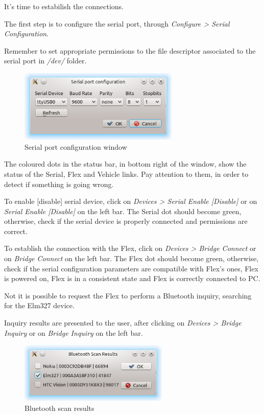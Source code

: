 \documentclass[twoside]{article}
\begin{document}
\begin{multicols}{2}
It's time to estabilish the connections.

The first step is to configure the serial port, through \emph{Configure > Serial Configuration}.

Remember to set appropriate permissions to the file descriptor associated to the serial port in \emph{/dev/} folder.

\begin{figure}[H]
  \centering
  \includegraphics[width=3in]{img/GUI/serial_port_configuration}
  \caption{Serial port configuration window}
\end{figure}


The coloured dots in the status bar, in bottom right of the window, show the status of the Serial, Flex and Vehicle links.
Pay attention to them, in order to detect if something is going wrong.

To enable [disable] serial device, click on \emph{Devices > Serial Enable [Disable]} or on \emph{Serial Enable [Disable]} on the left bar.
The Serial dot should become green, otherwise, check if the serial device is properly connected and permissions are correct.

To establish the connection with the Flex, click on \emph{Devices > Bridge Connect} or on \emph{Bridge Connect} on the left bar.
The Flex dot should become green, otherwise, check if the serial configuration parameters are compatible with Flex's ones, Flex is powered on, Flex is in a consistent state and Flex is correctly connected to PC.

Not it is possible to request the Flex to perform a Bluetooth inquiry, searching for the Elm327 device.

Inquiry results are presented to the user, after clicking on \emph{Devices > Bridge Inquiry} or on \emph{Bridge Inquiry} on the left bar.

\begin{figure}[H]
  \centering
  \includegraphics[width=2.8in]{img/GUI/bluetooth_scan_results}
  \caption{Bluetooth scan results}
\end{figure}


\end{multicols}
\end{document}
